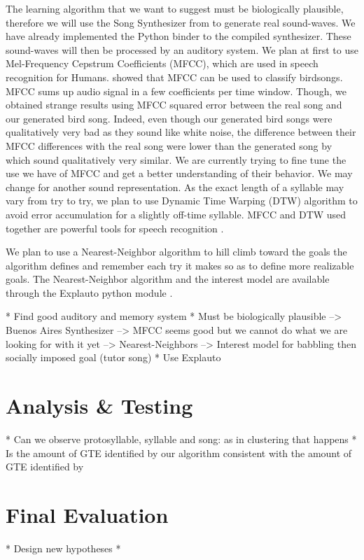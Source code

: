\documentclass[a4paper, 11pt]{article}
\begin{document}
The learning algorithm that we want to suggest must be biologically plausible,
therefore we will use the Song Synthesizer from \textcite{boari_automatic_2015}
to generate real sound-waves. We have already implemented the Python binder to
the compiled synthesizer.
These sound-waves will then be processed by an
auditory system. We plan at first to use Mel-Frequency Cepstrum Coefficients
(MFCC), which are used in speech recognition for Humans.
\textcite{chou_studies_2008} showed that MFCC can be used to classify birdsongs.
MFCC sums up audio signal in a few coefficients per time window. Though, we
obtained strange results using MFCC squared error between the real song and
our generated bird song. Indeed, even though our generated bird songs were
qualitatively very bad as they sound like white noise, the difference between
their MFCC differences with the real song were lower than the generated song by
\textcite{boari_automatic_2015} which sound qualitatively very similar.
We are currently trying to fine tune the use we have of MFCC and get a better
understanding of their behavior. We may change for another sound representation.
As the exact length of a syllable may vary from try to try, we plan to use
Dynamic Time Warping (DTW) algorithm to avoid error accumulation for a slightly
off-time syllable. MFCC and DTW used together are powerful tools for speech
recognition \parencite{muda_voice_2010}.

We plan to use a Nearest-Neighbor algorithm to hill climb toward the goals the
algorithm defines and remember each try it makes so as to define more realizable
goals. The Nearest-Neighbor algorithm and the interest model are available
through the Explauto python module \parencite{moulin-frier_explauto:_2014}.

\ifx
* Find good auditory and memory system
  * Must be biologically plausible
  --> Buenos Aires Synthesizer
  --> MFCC seems good but we cannot do what we are looking for with it yet
  --> Nearest-Neighbors
  --> Interest model for babbling then socially imposed goal (tutor song)
    \parencite{baranes_active_2013}
* Use Explauto \parencite{moulin-frier_explauto:_2014}
\fi

\section*{Analysis \& Testing}


\ifx
* Can we observe protosyllable, syllable and song: as in clustering that happens
* Is the amount of GTE identified by our algorithm consistent with the amount of
GTE identified by \textcite{boari_automatic_2015}
\fi

\section*{Final Evaluation}
\ifx
* Design new hypotheses
*
\fi


\printbibliography{}
\end{document}
